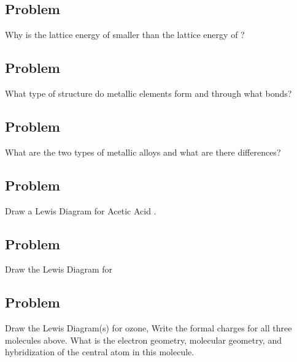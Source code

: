 \documentclass[../main.tex]{subfiles}
\begin{document}
\subsection*{Problem \countThis}
Why is the lattice energy of  smaller than the lattice energy of ?
\subsection*{Problem \countThis}
What type of structure do metallic elements form and through what bonds? 
\subsection*{Problem \countThis}
What are the two types of metallic alloys and what are there differences?
\subsection*{Problem \countThis}
Draw a Lewis Diagram for Acetic Acid .
\subsection*{Problem \countThis}
Draw the Lewis Diagram for 
\subsection*{Problem \countThis}
Draw the Lewis Diagram(s) for ozone, 
\ProblemSet
Write the formal charges for all three molecules above.
\ProblemSet
What is the electron geometry, molecular geometry, and hybridization of the central atom in this molecule. \\ 
\end{document}
